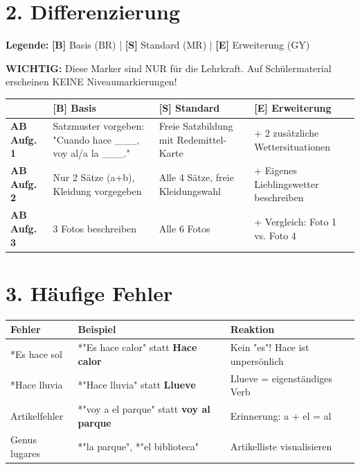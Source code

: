 \documentclass[11pt, a4paper]{article}
\newcommand{\fachfarbe}{spanisch}
\newcommand{\B}{\textcolor{basis}{\textbf{[B]}}}
\newcommand{\Std}{\textcolor{standard}{\textbf{[S]}}}
\newcommand{\E}{\textcolor{erweiterung}{\textbf{[E]}}}
\newcommand{\es}[1]{\textcolor{\fachfarbe}{\textbf{#1}}}
\begin{document}

\section*{2. Differenzierung}

\begin{differenzierung}
\textbf{Legende:} \B{} Basis (BR) | \Std{} Standard (MR) | \E{} Erweiterung (GY)

\vspace{0.5em}

\textbf{WICHTIG:} Diese Marker sind NUR für die Lehrkraft. Auf Schülermaterial erscheinen KEINE Niveaumarkierungen!
\end{differenzierung}

\vspace{1em}

\begin{tabularx}{\textwidth}{|l|X|X|X|}
\hline
& \B{} \textbf{Basis} & \Std{} \textbf{Standard} & \E{} \textbf{Erweiterung} \\
\hline
\textbf{AB Aufg. 1} & Satzmuster vorgeben: "Cuando hace \_\_\_, voy al/a la \_\_\_." & Freie Satzbildung mit Redemittel-Karte & + 2 zusätzliche Wettersituationen \\
\hline
\textbf{AB Aufg. 2} & Nur 2 Sätze (a+b), Kleidung vorgegeben & Alle 4 Sätze, freie Kleidungswahl & + Eigenes Lieblingswetter beschreiben \\
\hline
\textbf{AB Aufg. 3} & 3 Fotos beschreiben & Alle 6 Fotos & + Vergleich: Foto 1 vs. Foto 4 \\
\hline
\end{tabularx}


\section*{3. Häufige Fehler}

\begin{fehlerbox}
\begin{tabularx}{\textwidth}{|l|X|X|}
\hline
\textbf{Fehler} & \textbf{Beispiel} & \textbf{Reaktion} \\
\hline
*Es hace sol & *"Es hace calor" statt \es{Hace calor} & Kein "es"! Hace ist unpersönlich \\
\hline
*Hace lluvia & *"Hace lluvia" statt \es{Llueve} & Llueve = eigenständiges Verb \\
\hline
Artikelfehler & *"voy a el parque" statt \es{voy al parque} & Erinnerung: a + el = al \\
\hline
Genus lugares & *"la parque", *"el biblioteca" & Artikelliste visualisieren \\
\hline
\end{tabularx}
\end{fehlerbox}
\end{document}
